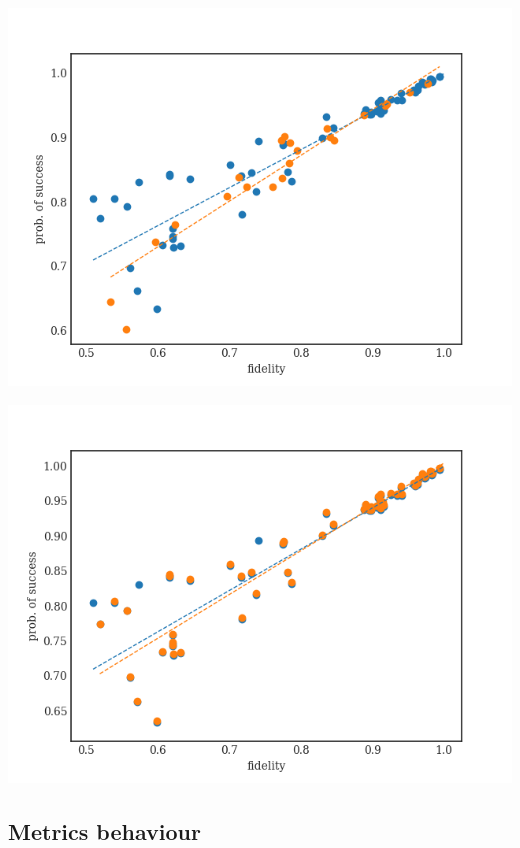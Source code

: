 \begin{center}
\includegraphics[width=.9\linewidth]{figures/f_ps_correlation_with_meas_error.png}
\end{center}

\begin{center}
\includegraphics[width=.9\linewidth]{figures/f_ps_correlation_no_meas_error.png}
\end{center}


\subsection{Metrics behaviour}
\label{sec:org985dd6b}


